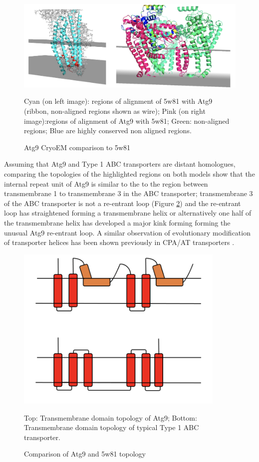 \begin{figure}[th!]
    \centering
    \includegraphics[width=\linewidth]{Modelling of Atg9/cryo_vs_5w81.png}
    \caption{Atg9 CryoEM comparison to 5w81}
    \label{fig:croem_vs_5w81}
    \small
    Cyan (on left image): regions of alignment of 5w81 with Atg9 (ribbon, non-aligned regions shown as wire); Pink (on right image):regions of alignment of Atg9 with 5w81; Green: non-aligned regions; Blue are highly conserved non aligned regions. 
\end{figure}

Assuming that Atg9 and Type 1 ABC transporters are distant homologues, comparing the topologies of the highlighted regions on both models show that the internal repeat unit of Atg9 is similar to the to the region between transmembrane 1 to transmembrane 3 in the ABC transporter;   transmembrane 3 of the ABC transporter is not a re-entrant loop (Figure \ref{fig:abc_topo}) and the re-entrant loop has straightened forming a transmembrane helix or alternatively one half of the transmembrane helix has developed a major kink forming forming the unusual Atg9 re-entrant loop.  A similar observation of evolutionary modification of transporter helices has been shown previously in CPA/AT transporters \cite{sudha2021evolutionary}.

\begin{figure}[th!]
    \centering
    \includegraphics[width=100mm, scale=0.9]{Modelling of Atg9/atg9_topo_abc.png}
    \caption{Comparison of Atg9 and 5w81 topology}
    \label{fig:abc_topo}
    \small
    Top: Transmembrane domain topology of Atg9; Bottom: Transmembrane domain topology of typical Type 1 ABC transporter.
\end{figure}

